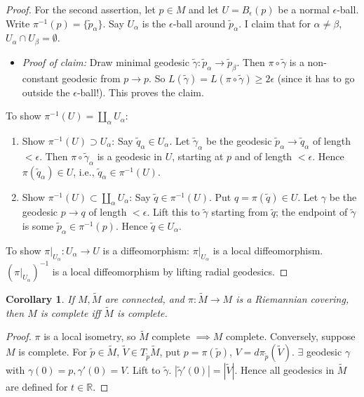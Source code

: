 \documentclass[11pt, a4paper]{article}
\theoremstyle{plain}
\newtheorem{corollary}[theorem]{Corollary}
\theoremstyle{definition}
\theoremstyle{remark}
\begin{document}
{\begin{proof}
For the second assertion, let $p \in M$ and let $U = B_\epsilon(p)$ be a normal $\epsilon$-ball. Write $\pi^{-1}(p) = \{\tilde{p}_\alpha\}$. Say $U_\alpha$ is the $\epsilon$-ball around $\tilde{p}_\alpha$. I claim that for $\alpha \neq \beta$, $U_\alpha \cap U_\beta = \emptyset$.
\begin{itemize}
    \item \textit{Proof of claim:} Draw minimal geodesic $\tilde{\gamma}: \tilde{p}_\alpha \to \tilde{p}_\beta$. Then $\pi \circ \tilde{\gamma}$ is a non-constant geodesic from $p \to p$. So $L(\tilde{\gamma}) = L(\pi \circ \tilde{\gamma}) \ge 2\epsilon$ (since it has to go outside the $\epsilon$-ball!). This proves the claim.
\end{itemize}
To show $\pi^{-1}(U) = \coprod_\alpha U_\alpha$:
\begin{enumerate}
    \item[a.] Show $\pi^{-1}(U) \supset U_\alpha$: Say $\tilde{q}_\alpha \in U_\alpha$. Let $\tilde{\gamma}_\alpha$ be the geodesic $\tilde{p}_\alpha \to \tilde{q}_\alpha$ of length $< \epsilon$. Then $\pi \circ \tilde{\gamma}_\alpha$ is a geodesic in $U$, starting at $p$ and of length $< \epsilon$. Hence $\pi(\tilde{q}_\alpha) \in U$, i.e., $\tilde{q}_\alpha \in \pi^{-1}(U)$.
    \item[b.] Show $\pi^{-1}(U) \subset \coprod_\alpha U_\alpha$: Say $\tilde{q} \in \pi^{-1}(U)$. Put $q = \pi(\tilde{q}) \in U$. Let $\gamma$ be the geodesic $p \to q$ of length $< \epsilon$. Lift this to $\tilde{\gamma}$ starting from $\tilde{q}$; the endpoint of $\tilde{\gamma}$ is some $\tilde{p}_\alpha \in \pi^{-1}(p)$. Hence $\tilde{q} \in U_\alpha$.
\end{enumerate}
To show $\pi|_{U_\alpha}: U_\alpha \to U$ is a diffeomorphism: $\pi|_{U_\alpha}$ is a local diffeomorphism. $(\pi|_{U_\alpha})^{-1}$ is a local diffeomorphism by lifting radial geodesics.
\end{proof}

\begin{corollary}
If $M, \tilde{M}$ are connected, and $\pi: \tilde{M} \to M$ is a Riemannian covering, then $M$ is complete iff $\tilde{M}$ is complete.
\end{corollary}

\begin{proof}
$\pi$ is a local isometry, so $\tilde{M}$ complete $\implies M$ complete.
Conversely, suppose $M$ is complete. For $\tilde{p} \in \tilde{M}$, $\tilde{V} \in T_{\tilde{p}}\tilde{M}$, put $p = \pi(\tilde{p})$, $V = d\pi_{\tilde{p}}(\tilde{V})$. $\exists$ geodesic $\gamma$ with $\gamma(0) = p, \gamma'(0) = V$. Lift to $\tilde{\gamma}$. $|\tilde{\gamma}'(0)| = |\tilde{V}|$. Hence all geodesics in $\tilde{M}$ are defined for $t \in \mathbb{R}$.
\end{proof}

}
\end{document}
